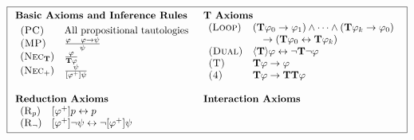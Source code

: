 \documentclass[letterpaper]{article}
\theoremstyle{definition}
\newcommand{\axiom}{\textsc}
\newcommand{\Typ}{\textrm{\textup{\textbf{T}}}}
\begin{document}
\begin{figure}[ht!]
\begin{equation*}
\boxed{
\begin{array}{ll}
    \textbf{Basic Axioms and Inference Rules} &
    \Typ \textbf{ Axioms} \\
    
    \begin{array}{ll}
         \axiom{(PC)} & \mbox{All propositional tautologies}\\
    
        \axiom{(MP)} & \frac{\varphi \quad \varphi \to \psi}{\psi} \\
        
        (\axiom{Nec}_\Typ) & \frac{\varphi}{\Typ \varphi}\\
        
        (\axiom{Nec}_+) & \frac{\psi}{[\varphi^+] \psi}\\
    \end{array} &
    
    \begin{array}{ll}
        (\axiom{Loop}) & 
        (\Typ \varphi_0 \to \varphi_1)
        \land \cdots \land 
        (\Typ \varphi_k \to \varphi_0) 
        \\
        & \quad \to (\Typ \varphi_0 \leftrightarrow \Typ \varphi_k) \\
         
        \axiom{(Dual)} & \langle \Typ \rangle \varphi \leftrightarrow \neg \Typ \neg \varphi\\
    
        \axiom{(T)} & \Typ \varphi \to \varphi\\
        
        \axiom{(4)} & \Typ \varphi \to \Typ \Typ \varphi\\
    \end{array}
    
    \\ \\
    \textbf{Reduction Axioms} & \textbf{Interaction Axioms}\\
    
    \begin{array}{ll}
         (\axiom{R}_p) & [\varphi^+] p \leftrightarrow p \\
    
        (\axiom{R}_\neg) & [\varphi^+] \neg \psi \leftrightarrow \neg [\varphi^+] \psi \\
        

\end{array}
\end{array}}
\end{equation*}
\end{figure}
\end{document}

